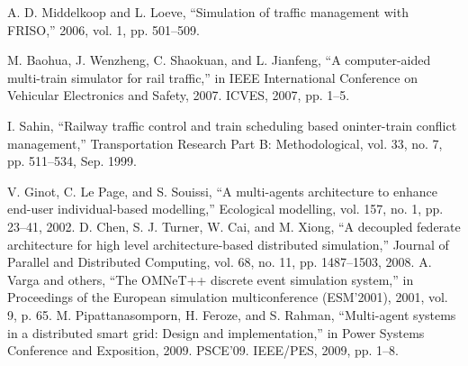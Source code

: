 \documentclass[conference]{IEEEtran}
\begin{document}
\begin{thebibliography}{1}

A. D. Middelkoop and L. Loeve, “Simulation of traffic management with FRISO,” 2006, vol. 1, pp. 501–509.

M. Baohua, J. Wenzheng, C. Shaokuan, and L. Jianfeng, “A computer-aided multi-train simulator for rail traffic,” in IEEE International Conference on Vehicular Electronics and Safety, 2007. ICVES, 2007, pp. 1–5.

 I. Sahin, “Railway traffic control and train scheduling based oninter-train conflict management,” Transportation Research Part B: Methodological, vol. 33, no. 7, pp. 511–534, Sep. 1999.

V. Ginot, C. Le Page, and S. Souissi, “A multi-agents architecture to enhance end-user individual-based modelling,” Ecological modelling, vol. 157, no. 1, pp. 23–41, 2002.
D. Chen, S. J. Turner, W. Cai, and M. Xiong, “A decoupled federate architecture for high level architecture-based distributed simulation,” Journal of Parallel and Distributed Computing, vol. 68, no. 11, pp. 1487–1503, 2008.
A. Varga and others, “The OMNeT++ discrete event simulation system,” in Proceedings of the European simulation multiconference (ESM’2001), 2001, vol. 9, p. 65.
M. Pipattanasomporn, H. Feroze, and S. Rahman, “Multi-agent systems in a distributed smart grid: Design and implementation,” in Power Systems Conference and Exposition, 2009. PSCE’09. IEEE/PES, 2009, pp. 1–8.
 

\end{thebibliography}




\end{document}
